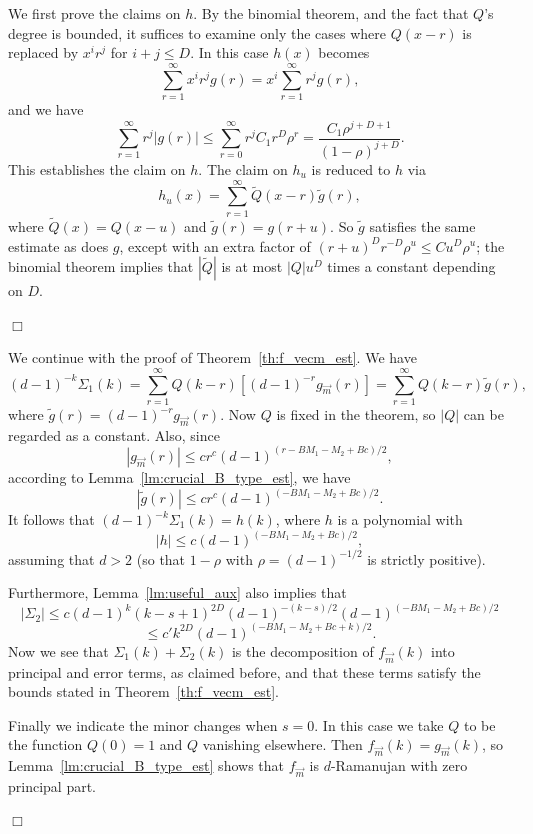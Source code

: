 \documentclass[12pt]{article}
\newcommand{\dtreelike}{{$d$-Ramanujan}}
\newcommand{\proofbox}{\begin{flushright}$\Box$\end{flushright}}
\begin{document}
We first prove the claims on $h$.
By the binomial theorem, and the fact that $Q$'s degree is bounded, it
suffices to examine only the cases where 
$Q(x-r)$ is replaced by $x^ir^j$ for $i+j\le D$.
In this case $h(x)$ becomes
$$
\sum_{r=1}^\infty x^ir^jg(r) =
x^i\sum_{r=1}^\infty r^jg(r),
$$
and we have
$$
\sum_{r=1}^\infty r^j |g(r)| \le
\sum_{r=0}^\infty r^j C_1r^D\rho^r = \frac{C_1\rho^{j+D+1}}{(1-\rho)^{j+D}}.
$$
This establishes the claim on $h$.  The claim on
$h_u$ is reduced to $h$ via
$$
h_u(x) = \sum_{r=1}^\infty \tilde Q(x-r) \tilde g(r),
$$
where $\tilde Q(x)=Q(x-u)$ and $\tilde g(r)=g(r+u)$.  So $\tilde g$
satisfies the same estimate as does $g$, except with an extra factor 
of $(r+u)^Dr^{-D}\rho^u\le Cu^D\rho^u$; 
the binomial theorem implies that $|\tilde Q|$ is at most
$|Q|u^D$ times a constant depending on $D$.
\proofbox

We continue with the proof of Theorem~\ref{th:f_vecm_est}.
We have
$$
(d-1)^{-k}\Sigma_1(k) = \sum_{r=1}^\infty Q(k-r) [(d-1)^{-r}g_{\vec m}(r)]
= \sum_{r=1}^\infty Q(k-r) \tilde g(r),
$$
where $\tilde g(r)=(d-1)^{-r}g_{\vec m}(r)$.  Now $Q$ is fixed in the
theorem, so $|Q|$ can be regarded as a constant.  Also, since
$$
|g_{\vec m}(r)| \le cr^c(d-1)^{(r-BM_1-M_2+Bc)/2},
$$
according to Lemma~\ref{lm:crucial_B_type_est}, we have
$$
|\tilde g(r)| \le cr^c(d-1)^{(-BM_1-M_2+Bc)/2}.
$$
It follows that $(d-1)^{-k}\Sigma_1(k)=h(k)$, where $h$ is a polynomial with
$$
|h|\le c (d-1)^{(-BM_1-M_2+Bc)/2},
$$
assuming that $d>2$ (so that $1-\rho$ with $\rho=(d-1)^{-1/2}$ is strictly
positive).

Furthermore, Lemma~\ref{lm:useful_aux} also implies that
$$
|\Sigma_2|\le c(d-1)^k (k-s+1)^{2D}(d-1)^{-(k-s)/2}(d-1)^{(-BM_1-M_2+Bc)/2}
$$
$$
\le c'k^{2D}(d-1)^{(-BM_1-M_2+Bc+k)/2}.
$$
Now we see that $\Sigma_1(k)+\Sigma_2(k)$ is the decomposition of 
$f_{\vec m}(k)$ into principal and error terms, as claimed before, and
that these terms satisfy the bounds stated in Theorem~\ref{th:f_vecm_est}.

Finally we indicate the minor changes when $s=0$.  In this case we take
$Q$ to be the function $Q(0)=1$ and $Q$ vanishing elsewhere.
Then $f_{\vec m}(k)=g_{\vec m}(k)$, so
Lemma~\ref{lm:crucial_B_type_est} shows that $f_{\vec m}$ is {\dtreelike}
with zero principal part.
\proofbox
\end{document}
